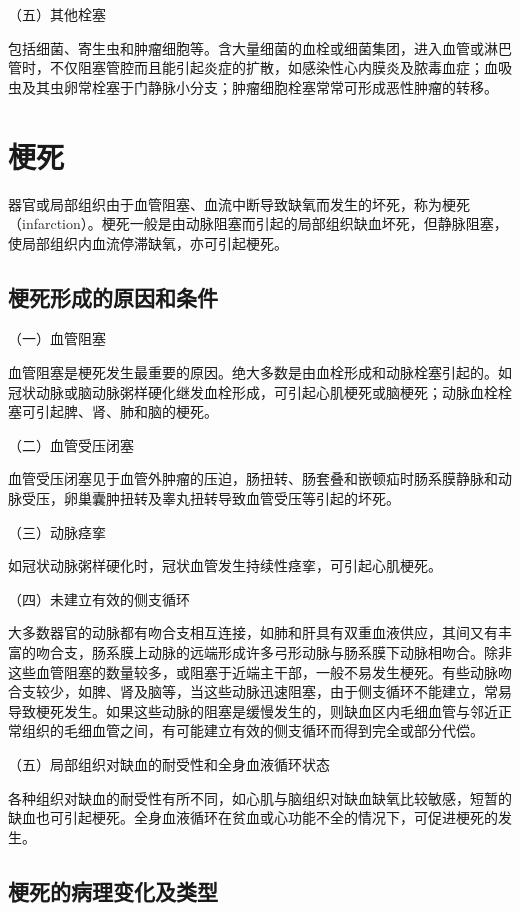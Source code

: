 {（五）其他栓塞}

包括细菌、寄生虫和肿瘤细胞等。含大量细菌的血栓或细菌集团，进入血管或淋巴管时，不仅阻塞管腔而且能引起炎症的扩散，如感染性心内膜炎及脓毒血症；血吸虫及其虫卵常栓塞于门静脉小分支；肿瘤细胞栓塞常常可形成恶性肿瘤的转移。

\section{梗死}

器官或局部组织由于血管阻塞、血流中断导致缺氧而发生的坏死，称为梗死（infarction）。梗死一般是由动脉阻塞而引起的局部组织缺血坏死，但静脉阻塞，使局部组织内血流停滞缺氧，亦可引起梗死。

\subsection{梗死形成的原因和条件}

{（一）血管阻塞}

血管阻塞是梗死发生最重要的原因。绝大多数是由血栓形成和动脉栓塞引起的。如冠状动脉或脑动脉粥样硬化继发血栓形成，可引起心肌梗死或脑梗死；动脉血栓栓塞可引起脾、肾、肺和脑的梗死。

{（二）血管受压闭塞}

血管受压闭塞见于血管外肿瘤的压迫，肠扭转、肠套叠和嵌顿疝时肠系膜静脉和动脉受压，卵巢囊肿扭转及睾丸扭转导致血管受压等引起的坏死。

{（三）动脉痉挛}

如冠状动脉粥样硬化时，冠状血管发生持续性痉挛，可引起心肌梗死。

{（四）未建立有效的侧支循环}

大多数器官的动脉都有吻合支相互连接，如肺和肝具有双重血液供应，其间又有丰富的吻合支，肠系膜上动脉的远端形成许多弓形动脉与肠系膜下动脉相吻合。除非这些血管阻塞的数量较多，或阻塞于近端主干部，一般不易发生梗死。有些动脉吻合支较少，如脾、肾及脑等，当这些动脉迅速阻塞，由于侧支循环不能建立，常易导致梗死发生。如果这些动脉的阻塞是缓慢发生的，则缺血区内毛细血管与邻近正常组织的毛细血管之间，有可能建立有效的侧支循环而得到完全或部分代偿。

{（五）局部组织对缺血的耐受性和全身血液循环状态}

各种组织对缺血的耐受性有所不同，如心肌与脑组织对缺血缺氧比较敏感，短暂的缺血也可引起梗死。全身血液循环在贫血或心功能不全的情况下，可促进梗死的发生。

\subsection{梗死的病理变化及类型}

